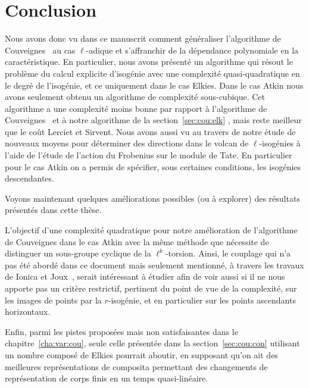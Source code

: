 \documentclass[10pt,a4paper]{book}
\theoremstyle{plain}
\theoremstyle{definition}
\theoremstyle{definition}
\theoremstyle{definition}
\theoremstyle{definition}
\theoremstyle{definition}
\theoremstyle{remark}
\theoremstyle{remark}
\theoremstyle{definition}
\begin{document}
\chapter*{Conclusion}

Nous avons donc vu dans ce manuscrit comment généraliser l'algorithme de 
Couveignes~\cite{Couveignes96} au cas $\ell$-adique et s'affranchir de la 
dépendance polynomiale en la caractéristique. En particulier, nous avons 
présenté un algorithme qui résout le problème du calcul explicite d'isogénie 
avec une complexité quasi-quadratique en le degré de l'isogénie, et ce 
uniquement dans le cas Elkies. Dans le cas Atkin nous avons seulement obtenu 
un algorithme de complexité sous-cubique. Cet algorithme a une complexité moins
bonne par rapport à l'algorithme de Couveignes~\cite{Couveignes96} et à notre 
algorithme de la section~\ref{sec:cou:elk} , mais reste meilleur que le coût 
Lerciet et Sirvent\cite{Lercier-Sirvent2008}.
Nous avons aussi vu au travers de notre étude de nouveaux 
moyens pour déterminer des directions dans le volcan de $\ell$-isogénies à 
l'aide de l'étude de l'action du Frobenius sur le module de Tate. En 
particulier pour le cas Atkin on a permis de spécifier, sous certaines 
conditions, les isogénies descendantes.

Voyons maintenant quelques améliorations possibles (ou à explorer) des 
résultats présentés dans cette thèse.


L'objectif d'une complexité quadratique pour notre amélioration de l'algorithme
de Couveignes dans le cas Atkin avec la même méthode que \cite{Couveignes96} 
nécessite de distinguer un sous-groupe cyclique de la $\ell^k$-torsion.
Ainsi, le couplage qui n'a pas été abordé dans ce document mais seulement 
mentionné, à travers les travaux de Ionica et Joux~\cite{Ionica-Joux10},
serait intéressant à étudier afin de voir aussi si il ne nous apporte pas un 
critère restrictif, pertinent du point de vue de la complexité, sur les images 
de points par la $r$-isogénie, et en particulier sur les points ascendants 
horizontaux.

Enfin, parmi les pistes proposées mais non satisfaisantes dans le 
chapitre~\ref{cha:var:cou}, seule celle présentée dans la 
section~\ref{sec:cou:con} utilisant un nombre composé de Elkies pourrait 
aboutir, en supposant qu'on ait des meilleures représentations de composita 
permettant des changements de représentation de corps finis en un temps 
quasi-linéaire.
\end{document}

